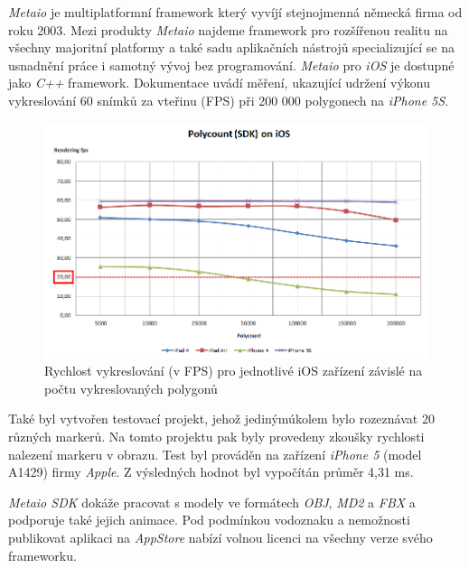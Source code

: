 \documentclass[twoside,12pt]{article}
\begin{document}
\textit{Metaio} je multiplatformní framework který vyvíjí stejnojmenná německá firma od roku 2003. Mezi produkty \textit{Metaio} najdeme framework pro rozšířenou realitu na všechny majoritní platformy a také sadu aplikačních nástrojů specializující se na usnadnění práce i samotný vývoj bez programování. \textit{Metaio} pro \textit{iOS} je dostupné jako \textit{C++} framework. 
Dokumentace uvádí měření, ukazující udržení výkonu vykreslování 60 snímků za vteřinu (FPS) při 200 000 polygonech na \textit{iPhone 5S}.

\begin{figure}[H]
\centering
    \includegraphics[width=424px, center]{images/Polycount_SDK_iOS_20fps.png}
\captionsetup{justification=centering}
    \caption{Rychlost vykreslování (v FPS) pro jednotlivé iOS zařízení závislé na počtu vykreslovaných polygonů}
    \label{metaio_benchmark}
\end{figure}

Také byl vytvořen testovací projekt, jehož jedinýmúkolem bylo rozeznávat 20 různých markerů. Na tomto projektu pak byly provedeny zkoušky rychlosti nalezení markeru v obrazu. Test byl prováděn na zařízení \textit{iPhone 5} (model A1429) firmy \textit{Apple}. Z výsledných hodnot byl vypočítán průměr 4,31 ms. 


\textit{Metaio SDK} dokáže pracovat s modely ve formátech \textit{OBJ}, \textit{MD2} a \textit{FBX} a podporuje také jejich animace. Pod podmínkou vodoznaku a nemožnosti publikovat aplikaci na \textit{AppStore} nabízí volnou licenci na všechny verze svého frameworku. 
\end{document}

